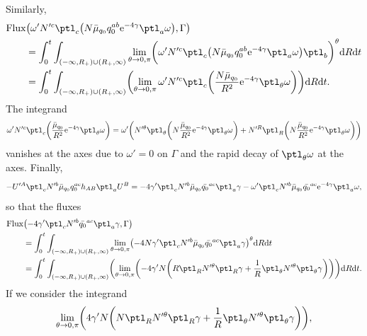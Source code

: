 Similarly,
\begin{align*}
& {\rm Flux} \bigl(\omega' N'^c \ptl_c \bigl(N \bar{\mu}_{q_0} q^{ab}_0 {\rm e}^{-4\gamma} \ptl_a \omega\bigr), \Gamma\bigr) \notag\\
&{}\qquad{}=
\int^t_0 \int_{ (-\infty, R_+) \cup (R_+, \infty) } \lim_{\theta \to 0, \pi} \biggl( \omega' N'^c \ptl_c \bigl(N \bar{\mu}_{q_0} q^{ab}_0 {\rm e}^{-4\gamma} \ptl_a \omega\bigr) \ptl_b \biggr)^\theta {\rm d}R {\rm d}t \\
&{}\qquad{}= \int^t_0 \int_{ (-\infty, R_+) \cup (R_+, \infty) } \biggl( \lim_{\theta \to 0, \pi} \omega' N'^c \ptl_c \biggl(\frac{N \bar{\mu}_{q_0}}{R^2} {\rm e}^{-4\gamma} \ptl_\theta \omega\biggr) \biggr) {\rm d}R {\rm d}t.
\end{align*}
The integrand
\begin{align*}
 \omega' N'^c \ptl_c \biggl(\frac{\bar{\mu}_{q_0}}{R^2} {\rm e}^{-4\gamma} \ptl_\theta \omega\biggr)= \omega' \biggl(N'^\theta \ptl_\theta \biggl(N \frac{\bar{\mu}_{q_0}}{R^2} {\rm e}^{-4\gamma} \ptl_\theta \omega\biggr) + N'^ R \ptl_R \biggl(N \frac{\bar{\mu}_{q_0}}{R^2} {\rm e}^{-4\gamma} \ptl_\theta \omega\biggr)\biggr)
\end{align*}
vanishes at the axes due to $\omega' =0$ on $\Gamma$ and the rapid decay of $\ptl_\theta \omega$ at the axes.
Finally,
\begin{align*}
-U'^A \ptl_c N'^b \bar{\mu}_{q_0} q^{ac}_0 h_{AB} \ptl_a U^B = -4\gamma' \ptl_c N'^b \bar{\mu}_{q_0} \bar{q_0}^{ac} \ptl_a \gamma
-\omega' \ptl_c N'^b \bar{\mu}_{q_0} \bar{q_0}^{ac} {\rm e}^{-4\gamma} \ptl_a \omega,
\end{align*}
so that the fluxes
\begin{align*}
& {\rm Flux} \bigl(-4\gamma' \ptl_c N'^b \bar{q_0}^{ac} \ptl_a \gamma, \Gamma\bigr) \notag\\
&\qquad{}= \int^t_0 \int_{ (-\infty, R_+) \cup (R_+, \infty) } \lim_{\theta \to 0, \pi} \bigl( -4N \gamma' \ptl_c N'^b \bar{\mu}_{q_0} \bar{q_0}^{ac} \ptl_a \gamma \bigr)^\theta {\rm d}R {\rm d}t \notag\\
&\qquad{}= \int^t_0 \int_{ (-\infty, R_+) \cup (R_+, \infty) }\biggl(\lim_{\theta \to 0, \pi} \biggl(-4 \gamma' N \biggl(R \ptl_R N'^\theta \ptl_R \gamma + \frac{1}{R} \ptl_\theta N'^\theta \ptl_\theta \gamma\biggr)\biggr) \biggr) {\rm d}R {\rm d}t.
\end{align*}
If we consider the integrand
\begin{align*}
\lim_{\theta \to 0, \pi} \biggl(4 \gamma' N \biggl(N\ptl_R N'^\theta \ptl_R \gamma + \frac{1}{R} \ptl_\theta N'^\theta \ptl_\theta \gamma\biggr)\biggr),
\end{align*}
